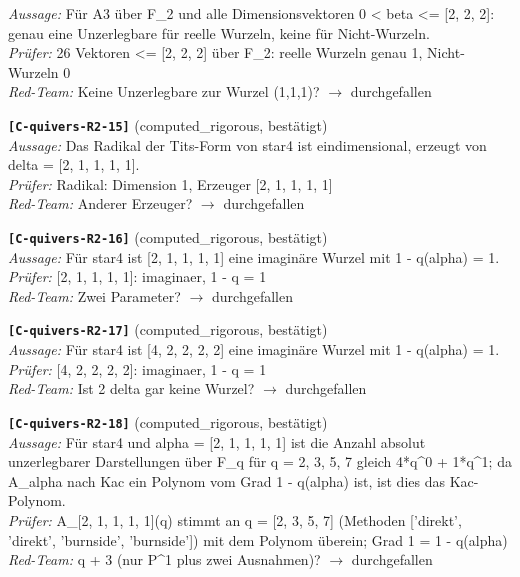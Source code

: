 \documentclass[11pt]{article}
\theoremstyle{definition}\newtheorem{definition}[theorem]{Definition}\newtheorem{remark}[theorem]{Remark}\newtheorem{observation}[theorem]{Numerical observation}
\begin{document}
\textit{Aussage:} Für A3 über F\_2 und alle Dimensionsvektoren 0 < beta <= [2, 2, 2]: genau eine Unzerlegbare für reelle Wurzeln, keine für Nicht-Wurzeln.\\
\textit{Prüfer:} 26 Vektoren <= [2, 2, 2] über F\_2: reelle Wurzeln genau 1, Nicht-Wurzeln 0\\
\textit{Red-Team:} Keine Unzerlegbare zur Wurzel (1,1,1)? $\to$ durchgefallen\par\medskip
\noindent\textbf{\texttt{[C-quivers-R2-15]}} (computed\_rigorous, bestätigt)\\
\textit{Aussage:} Das Radikal der Tits-Form von star4 ist eindimensional, erzeugt von delta = [2, 1, 1, 1, 1].\\
\textit{Prüfer:} Radikal: Dimension 1, Erzeuger [2, 1, 1, 1, 1]\\
\textit{Red-Team:} Anderer Erzeuger? $\to$ durchgefallen\par\medskip
\noindent\textbf{\texttt{[C-quivers-R2-16]}} (computed\_rigorous, bestätigt)\\
\textit{Aussage:} Für star4 ist [2, 1, 1, 1, 1] eine imaginäre Wurzel mit 1 - q(alpha) = 1.\\
\textit{Prüfer:} [2, 1, 1, 1, 1]: imaginaer, 1 - q = 1\\
\textit{Red-Team:} Zwei Parameter? $\to$ durchgefallen\par\medskip
\noindent\textbf{\texttt{[C-quivers-R2-17]}} (computed\_rigorous, bestätigt)\\
\textit{Aussage:} Für star4 ist [4, 2, 2, 2, 2] eine imaginäre Wurzel mit 1 - q(alpha) = 1.\\
\textit{Prüfer:} [4, 2, 2, 2, 2]: imaginaer, 1 - q = 1\\
\textit{Red-Team:} Ist 2 delta gar keine Wurzel? $\to$ durchgefallen\par\medskip
\noindent\textbf{\texttt{[C-quivers-R2-18]}} (computed\_rigorous, bestätigt)\\
\textit{Aussage:} Für star4 und alpha = [2, 1, 1, 1, 1] ist die Anzahl absolut unzerlegbarer Darstellungen über F\_q für q = 2, 3, 5, 7 gleich 4*q\textasciicircum{}0 + 1*q\textasciicircum{}1; da A\_alpha nach Kac ein Polynom vom Grad 1 - q(alpha) ist, ist dies das Kac-Polynom.\\
\textit{Prüfer:} A\_[2, 1, 1, 1, 1](q) stimmt an q = [2, 3, 5, 7] (Methoden ['direkt', 'direkt', 'burnside', 'burnside']) mit dem Polynom überein; Grad 1 = 1 - q(alpha)\\
\textit{Red-Team:} q + 3 (nur P\textasciicircum{}1 plus zwei Ausnahmen)? $\to$ durchgefallen\par\medskip
\end{document}
